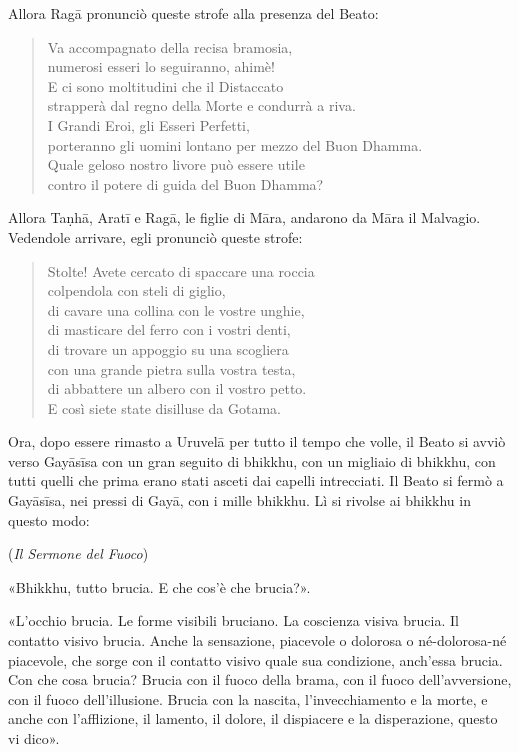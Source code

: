 Allora Ragā pronunciò queste strofe alla presenza del Beato:

\begin{quote}
Va accompagnato della recisa bramosia, \\
numerosi esseri lo seguiranno, ahimè! \\
E ci sono moltitudini che il Distaccato \\
strapperà dal regno della Morte e condurrà a riva. \\
I Grandi Eroi, gli Esseri Perfetti, \\
porteranno gli uomini lontano per mezzo del Buon Dhamma. \\
Quale geloso nostro livore può essere utile \\
contro il potere di guida del Buon Dhamma?
\end{quote}

Allora Taṇhā, Aratī e Ragā, le figlie di Māra, andarono da Māra il Malvagio.
Vedendole arrivare, egli pronunciò queste strofe:

\begin{quote}
Stolte! Avete cercato di spaccare una roccia \\
colpendola con steli di giglio, \\
di cavare una collina con le vostre unghie, \\
di masticare del ferro con i vostri denti, \\
di trovare un appoggio su una scogliera \\
con una grande pietra sulla vostra testa, \\
di abbattere un albero con il vostro petto. \\
E così siete state disilluse da Gotama.
\end{quote}


 Ora, dopo essere rimasto a Uruvelā per tutto il tempo che
volle, il Beato si avviò verso Gayāsīsa con un gran seguito di bhikkhu, con un
migliaio di bhikkhu, con tutti quelli che prima erano stati asceti dai capelli
intrecciati. Il Beato si fermò a Gayāsīsa, nei pressi di Gayā, con i mille
bhikkhu. Lì si rivolse ai bhikkhu in questo modo:

\label{pag73}%
(\emph{Il Sermone del Fuoco})

«Bhikkhu, tutto brucia. E che cos’è che brucia?».

«L’occhio brucia. Le forme visibili bruciano. La coscienza visiva brucia. Il
contatto visivo brucia. Anche la sensazione, piacevole o dolorosa o
né-dolorosa-né piacevole, che sorge con il contatto visivo quale sua condizione,
anch’essa brucia. Con che cosa brucia? Brucia con il fuoco della brama, con il
fuoco dell’avversione, con il fuoco dell’illusione. Brucia con la nascita,
l’invecchiamento e la morte, e anche con l’afflizione, il lamento, il dolore, il
dispiacere e la disperazione, questo vi dico».

